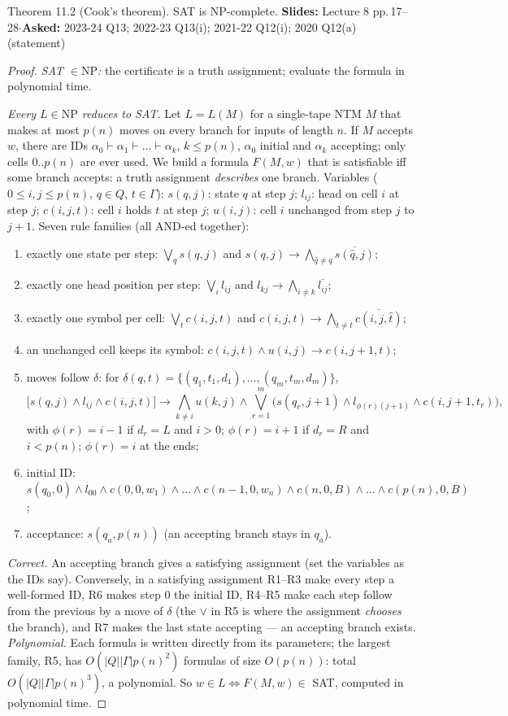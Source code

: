 \documentclass[10.5pt,a4paper]{article}
\newcommand{\src}[2]{{\footnotesize\color{gray!70!black}\textbf{Slides:} #1\enspace$\cdot$\enspace\textbf{Asked:} #2}\par}
\newcommand{\NP}{\mathrm{NP}}
\begin{document}
\begin{thm}{Theorem 11.2 (Cook's theorem). SAT is NP-complete.}
\src{Lecture 8 pp.\,17--28}{2023-24 Q13; 2022-23 Q13(i); 2021-22 Q12(i); 2020 Q12(a) (statement)}\end{thm}
\begin{proof}
\emph{SAT $\in\NP$:} the certificate is a truth assignment; evaluate the formula in polynomial time.

\emph{Every $L\in\NP$ reduces to SAT.} Let $L=L(M)$ for a single-tape NTM $M$ that makes at most $p(n)$ moves on every branch for inputs of
length $n$. If $M$ accepts $w$, there are IDs $\alpha_0\vdash\alpha_1\vdash\dots\vdash\alpha_k$, $k\le p(n)$, $\alpha_0$ initial and $\alpha_k$
accepting; only cells $0..p(n)$ are ever used. We build a formula $F(M,w)$ that is satisfiable iff some branch accepts: a truth assignment
\emph{describes} one branch. Variables ($0\le i,j\le p(n)$, $q\in Q$, $t\in\Gamma$):
$s(q,j)$: state $q$ at step $j$; $l_{ij}$: head on cell $i$ at step $j$; $c(i,j,t)$: cell $i$ holds $t$ at step $j$; $u(i,j)$: cell $i$ unchanged
from step $j$ to $j+1$. Seven rule families (all AND-ed together):
\begin{enumerate}[label=\textbf{R\arabic*.}]
\item exactly one state per step: $\bigvee_q s(q,j)$ and $s(q,j)\to\bigwedge_{\hat q\ne q}\overline{s(\hat q,j)}$;
\item exactly one head position per step: $\bigvee_i l_{ij}$ and $l_{kj}\to\bigwedge_{i\ne k}\overline{l_{ij}}$;
\item exactly one symbol per cell: $\bigvee_t c(i,j,t)$ and $c(i,j,t)\to\bigwedge_{\hat t\ne t}\overline{c(i,j,\hat t)}$;
\item an unchanged cell keeps its symbol: $c(i,j,t)\wedge u(i,j)\to c(i,j+1,t)$;
\item moves follow $\delta$: for $\delta(q,t)=\{(q_1,t_1,d_1),\dots,(q_m,t_m,d_m)\}$,
\[\big[s(q,j)\wedge l_{ij}\wedge c(i,j,t)\big]\to\bigwedge_{k\ne i}u(k,j)\wedge\bigvee_{r=1}^{m}\big(s(q_r,j{+}1)\wedge l_{\phi(r)(j+1)}\wedge c(i,j{+}1,t_r)\big),\]
with $\phi(r)=i-1$ if $d_r=L$ and $i>0$; $\phi(r)=i+1$ if $d_r=R$ and $i<p(n)$; $\phi(r)=i$ at the ends;
\item initial ID: $s(q_0,0)\wedge l_{00}\wedge c(0,0,w_1)\wedge\dots\wedge c(n{-}1,0,w_n)\wedge c(n,0,B)\wedge\dots\wedge c(p(n),0,B)$;
\item acceptance: $s(q_a,p(n))$ (an accepting branch stays in $q_a$).
\end{enumerate}
\emph{Correct.} An accepting branch gives a satisfying assignment (set the variables as the IDs say). Conversely, in a satisfying assignment R1--R3
make every step a well-formed ID, R6 makes step 0 the initial ID, R4--R5 make each step follow from the previous by a move of $\delta$ (the
$\vee$ in R5 is where the assignment \emph{chooses} the branch), and R7 makes the last state accepting --- an accepting branch exists.
\emph{Polynomial.} Each formula is written directly from its parameters; the largest family, R5, has $O(|Q||\Gamma|p(n)^2)$ formulas of size
$O(p(n))$: total $O(|Q||\Gamma|p(n)^3)$, a polynomial. So $w\in L\iff F(M,w)\in$ SAT, computed in polynomial time.
\end{proof}
\end{document}
